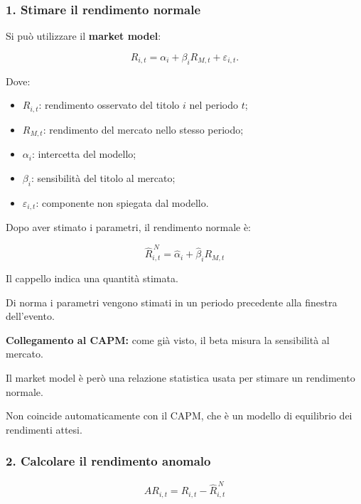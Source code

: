 \subsubsection*{1. Stimare il rendimento normale}

\noindent Si può utilizzare
il \textbf{market model}:

\[
R_{i,t}
=
\alpha_i+\beta_iR_{M,t}
+\varepsilon_{i,t}.
\]

\noindent Dove:

\begin{itemize}
    \item $R_{i,t}$: rendimento osservato
    del titolo $i$ nel periodo $t$;

    \item $R_{M,t}$: rendimento del mercato
    nello stesso periodo;

    \item $\alpha_i$: intercetta del modello;

    \item $\beta_i$: sensibilità del titolo
    al mercato;

    \item $\varepsilon_{i,t}$:
    componente non spiegata dal modello.
\end{itemize}

\noindent Dopo aver stimato i parametri,
il rendimento normale è:

\[
\boxed{
\widehat{R}^{\,N}_{i,t}
=
\widehat{\alpha}_i
+
\widehat{\beta}_iR_{M,t}
}
\]

\noindent Il cappello indica
una quantità stimata.

\noindent Di norma i parametri vengono stimati
in un periodo precedente alla finestra dell'evento.

\medskip

\noindent \textbf{Collegamento al CAPM:}
come già visto, il beta misura
la sensibilità al mercato.

\noindent Il market model è però una relazione
statistica usata per stimare
un rendimento normale.

\noindent Non coincide automaticamente con il CAPM,
che è un modello di equilibrio
dei rendimenti attesi.


\subsubsection*{2. Calcolare il rendimento anomalo}

\[
\boxed{
AR_{i,t}
=
R_{i,t}
-
\widehat{R}^{\,N}_{i,t}
}
\]

